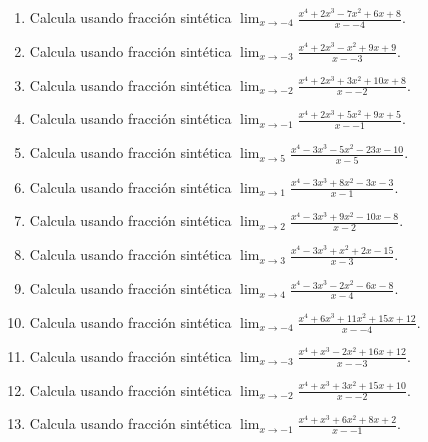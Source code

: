 \documentclass[11pt,a4paper]{article}
\begin{document}
\begin{enumerate}[label=\textbf{E\arabic*.},start=281]

\item Calcula usando fracción sintética $\displaystyle\lim_{x\to -4}\frac{x^4 + 2x^3 - 7x^2 + 6x + 8}{x--4}$. 

\item Calcula usando fracción sintética $\displaystyle\lim_{x\to -3}\frac{x^4 + 2x^3 - x^2 + 9x + 9}{x--3}$. 

\item Calcula usando fracción sintética $\displaystyle\lim_{x\to -2}\frac{x^4 + 2x^3 + 3x^2 + 10x + 8}{x--2}$. 

\item Calcula usando fracción sintética $\displaystyle\lim_{x\to -1}\frac{x^4 + 2x^3 + 5x^2 + 9x + 5}{x--1}$. 

\item Calcula usando fracción sintética $\displaystyle\lim_{x\to 5}\frac{x^4 - 3x^3 - 5x^2 - 23x - 10}{x-5}$. 

\item Calcula usando fracción sintética $\displaystyle\lim_{x\to 1}\frac{x^4 - 3x^3 + 8x^2 - 3x - 3}{x-1}$. 

\item Calcula usando fracción sintética $\displaystyle\lim_{x\to 2}\frac{x^4 - 3x^3 + 9x^2 - 10x - 8}{x-2}$. 

\item Calcula usando fracción sintética $\displaystyle\lim_{x\to 3}\frac{x^4 - 3x^3 + x^2 + 2x - 15}{x-3}$. 

\item Calcula usando fracción sintética $\displaystyle\lim_{x\to 4}\frac{x^4 - 3x^3 - 2x^2 - 6x - 8}{x-4}$. 

\item Calcula usando fracción sintética $\displaystyle\lim_{x\to -4}\frac{x^4 + 6x^3 + 11x^2 + 15x + 12}{x--4}$. 

\item Calcula usando fracción sintética $\displaystyle\lim_{x\to -3}\frac{x^4 + x^3 - 2x^2 + 16x + 12}{x--3}$. 

\item Calcula usando fracción sintética $\displaystyle\lim_{x\to -2}\frac{x^4 + x^3 + 3x^2 + 15x + 10}{x--2}$. 

\item Calcula usando fracción sintética $\displaystyle\lim_{x\to -1}\frac{x^4 + x^3 + 6x^2 + 8x + 2}{x--1}$. 


\end{enumerate}
\end{document}
